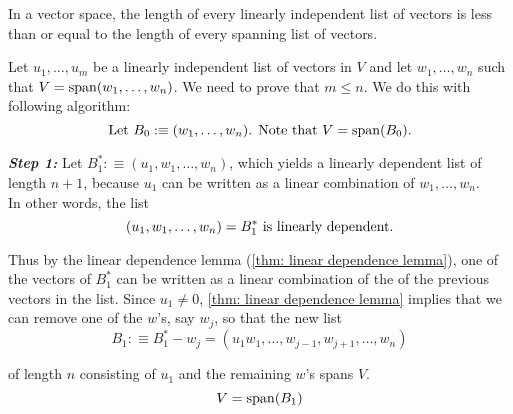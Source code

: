 \begin{thm}  
  \label{thm: length of linearly dependent list less or equal to length of spanning list}
  In a \fd vector space, the length of every linearly independent list of vectors is less than or equal to the length of every spanning list of vectors.
\end{thm}
\begin{prf}
  Let $u_1, \ldots, u_m$ be a linearly independent list of vectors in $V$ and let $w_1, \ldots, w_n$ such that $V=\operatorname{span} (w_1, \ldots, w_n)$. We need to prove that $m \leq n$. We do this with following algorithm:
  \begin{equation*}
      $Let $B_0 :\equiv  (w_1, \ldots, w_n)$. Note that $V=\myspan{B_0}.
  \end{equation*}

  \emph{\bfseries Step 1:} Let $B_1^* :\equiv (u_1, w_1, \ldots, w_n)$, which yields a linearly dependent list of length $n+1$, because $u_1$ can be written as a linear combination of $w_1, \ldots, w_n$. \\
  In other words, the list
  \begin{equation*}
    (u_1, w_1, \ldots, w_n) = B_1^* $ is linearly dependent.$
  \end{equation*}

  Thus by the linear dependence lemma (\ref{thm: linear dependence lemma}), one of the vectors of $B_1^*$ can be written as a linear combination of the of the previous vectors in the list. Since $u_1 \neq 0$, \ref{thm: linear dependence lemma} implies that we can remove one of the $w$'s, say $w_j$, so that the new list
  \begin{equation*}
    B_1 :\equiv B_1^* - {w_j} = (u_1 w_1, \ldots, w_{j-1}, w_{j+1}, \ldots, w_n)
  \end{equation*}

  of length $n$ consisting of $u_1$ and the remaining $w$'s spans $V$.
  \begin{equation*}
    V=\operatorname{span} (B_1)
  \end{equation*}


\end{prf}
